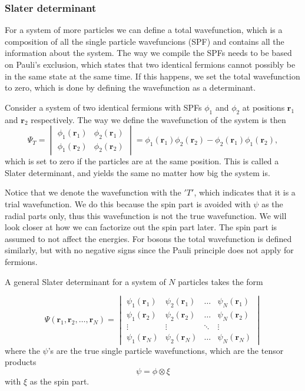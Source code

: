 \subsubsection{Slater determinant} \label{subsubsec:slater}
For a system of more particles we can define a total wavefunction, which is a composition of all the single particle wavefuncions (SPF) and contains all the information about the system. The way we compile the SPFs needs to be based on Pauli's exclusion, which states that two identical fermions cannot possibly be in the same state at the same time. If this happens, we set the total wavefunction to zero, which is done by defining the wavefunction as a determinant. 

Consider a system of two identical fermions with SPFs $\phi_1$ and $\phi_2$ at positions $\boldsymbol{r}_1$ and $\boldsymbol{r}_2$ respectively. The way we define the wavefunction of the system is then
\begin{equation}
\Psi_T=
\begin{vmatrix}
\phi_1(\boldsymbol{r}_1) & \phi_2(\boldsymbol{r}_1)\\
\phi_1(\boldsymbol{r}_2) & \phi_2(\boldsymbol{r}_2)
\end{vmatrix}
=\phi_1(\boldsymbol{r}_1)\phi_2(\boldsymbol{r}_2)-\phi_2(\boldsymbol{r}_1)\phi_1(\boldsymbol{r}_2),
\end{equation}
which is set to zero if the particles are at the same position. This is called a Slater determinant, and yields the same no matter how big the system is.

Notice that we denote the wavefunction with the $'T'$, which indicates that it is a trial wavefunction. We do this because the spin part is avoided with $\psi$ as the radial parts only, thus this wavefunction is not the true wavefunction. We will look closer at how we can factorize out the spin part later. The spin part is assumed to not affect the energies. For bosons the total wavefunction is defined similarly, but with no negative signs since the Pauli principle does not apply for fermions. 

A general Slater determinant for a system of $N$ particles takes the form

\begin{equation}
\Psi(\boldsymbol{r}_1,\boldsymbol{r}_2,\hdots,\boldsymbol{r}_N)=
\begin{vmatrix}
\psi_1(\boldsymbol{r}_1) & \psi_2(\boldsymbol{r}_1) & \hdots & \psi_N(\boldsymbol{r}_1)\\
\psi_1(\boldsymbol{r}_2) & \psi_2(\boldsymbol{r}_2) & \hdots & \psi_N(\boldsymbol{r}_2)\\
\vdots & \vdots & \ddots & \vdots \\
\psi_1(\boldsymbol{r}_N) & \psi_2(\boldsymbol{r}_N) & \hdots & \psi_N(\boldsymbol{r}_N)
\end{vmatrix}
\end{equation}
where the $\psi$'s are the true single particle wavefunctions, which are the tensor products 
\begin{equation}
\psi=\phi\otimes\xi
\end{equation}
with $\xi$ as the spin part. 

